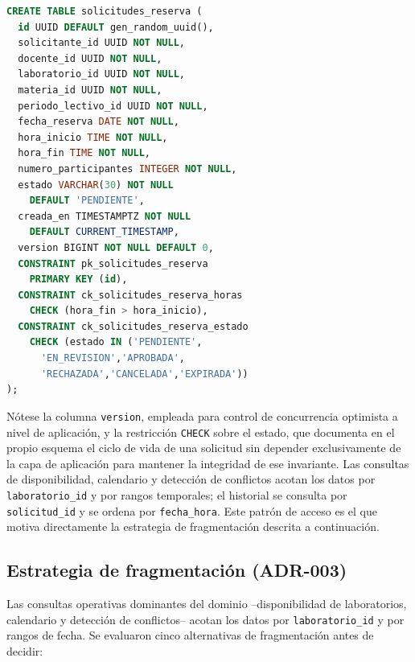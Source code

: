 \documentclass[10pt,twocolumn]{article}
\begin{document}
\begin{lstlisting}[language=sql,caption={Fragmento de \texttt{db/schema.sql}: definición de \texttt{solicitudes\_reserva}.},label={lst:schema}]
CREATE TABLE solicitudes_reserva (
  id UUID DEFAULT gen_random_uuid(),
  solicitante_id UUID NOT NULL,
  docente_id UUID NOT NULL,
  laboratorio_id UUID NOT NULL,
  materia_id UUID NOT NULL,
  periodo_lectivo_id UUID NOT NULL,
  fecha_reserva DATE NOT NULL,
  hora_inicio TIME NOT NULL,
  hora_fin TIME NOT NULL,
  numero_participantes INTEGER NOT NULL,
  estado VARCHAR(30) NOT NULL
    DEFAULT 'PENDIENTE',
  creada_en TIMESTAMPTZ NOT NULL
    DEFAULT CURRENT_TIMESTAMP,
  version BIGINT NOT NULL DEFAULT 0,
  CONSTRAINT pk_solicitudes_reserva
    PRIMARY KEY (id),
  CONSTRAINT ck_solicitudes_reserva_horas
    CHECK (hora_fin > hora_inicio),
  CONSTRAINT ck_solicitudes_reserva_estado
    CHECK (estado IN ('PENDIENTE',
      'EN_REVISION','APROBADA',
      'RECHAZADA','CANCELADA','EXPIRADA'))
);
\end{lstlisting}

Nótese la columna \texttt{version}, empleada para control de concurrencia
optimista a nivel de aplicación, y la restricción \texttt{CHECK} sobre el
estado, que documenta en el propio esquema el ciclo de vida de una
solicitud sin depender exclusivamente de la capa de aplicación para
mantener la integridad de ese invariante. Las consultas de disponibilidad,
calendario y detección de conflictos acotan los datos por
\texttt{laboratorio\_id} y por rangos temporales; el historial se consulta
por \texttt{solicitud\_id} y se ordena por \texttt{fecha\_hora}. Este
patrón de acceso es el que motiva directamente la estrategia de
fragmentación descrita a continuación.

\subsection{Estrategia de fragmentación (ADR-003)}


Las consultas operativas dominantes del dominio --disponibilidad de
laboratorios, calendario y detección de conflictos-- acotan los datos por
\texttt{laboratorio\_id} y por rangos de fecha. Se evaluaron cinco
alternativas de fragmentación antes de decidir:
\end{document}
